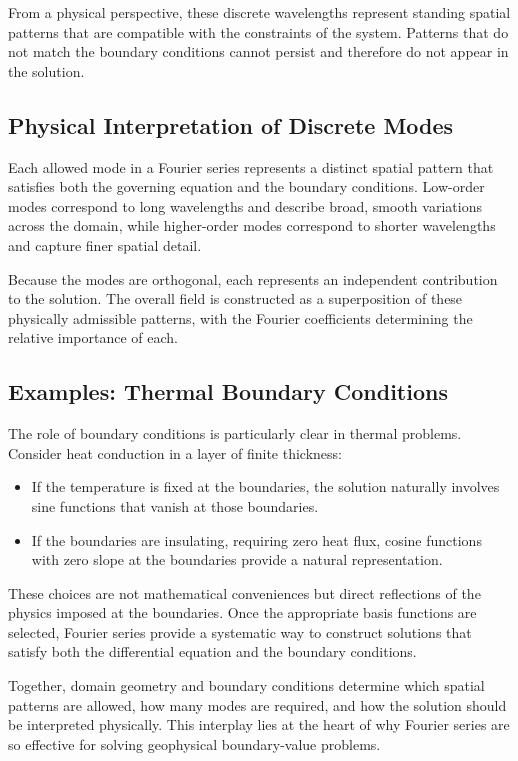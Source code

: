 From a physical perspective, these discrete wavelengths represent standing spatial patterns that are compatible with the constraints of the system. Patterns that do not match the boundary conditions cannot persist and therefore do not appear in the solution.

\subsection{Physical Interpretation of Discrete Modes}

Each allowed mode in a Fourier series represents a distinct spatial pattern that satisfies both the governing equation and the boundary conditions. Low-order modes correspond to long wavelengths and describe broad, smooth variations across the domain, while higher-order modes correspond to shorter wavelengths and capture finer spatial detail.

Because the modes are orthogonal, each represents an independent contribution to the solution. The overall field is constructed as a superposition of these physically admissible patterns, with the Fourier coefficients determining the relative importance of each.

\subsection{Examples: Thermal Boundary Conditions}

The role of boundary conditions is particularly clear in thermal problems. Consider heat conduction in a layer of finite thickness:
\begin{itemize}
    \item If the temperature is fixed at the boundaries, the solution naturally involves sine functions that vanish at those boundaries.
    \item If the boundaries are insulating, requiring zero heat flux, cosine functions with zero slope at the boundaries provide a natural representation.
\end{itemize}

These choices are not mathematical conveniences but direct reflections of the physics imposed at the boundaries. Once the appropriate basis functions are selected, Fourier series provide a systematic way to construct solutions that satisfy both the differential equation and the boundary conditions.

Together, domain geometry and boundary conditions determine which spatial patterns are allowed, how many modes are required, and how the solution should be interpreted physically. This interplay lies at the heart of why Fourier series are so effective for solving geophysical boundary-value problems.


